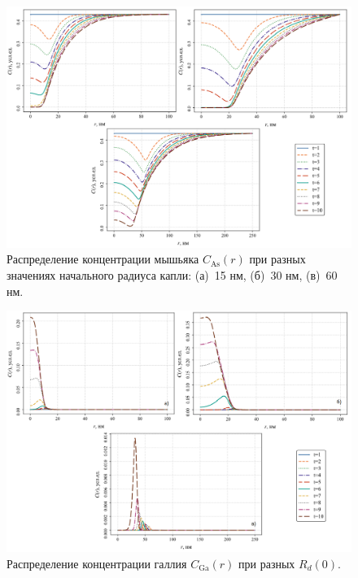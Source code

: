 \documentclass[14pt,oneside]{extarticle}
\begin{document}
\begin{figure}
    \begin{center}
    \includegraphics[width=18cm]{images/C_As_t_3.png}
    \caption{\label{fig:rd_c_as} Распределение концентрации мышьяка $C_{\text{As}}(r)$ при разных значениях начального радиуса капли: (а)~15 нм, (б)~30 нм, (в)~60 нм.}
    \end{center}
\end{figure}

\begin{figure}
    \begin{center}
    \includegraphics[width=18cm]{images/C_Ga_t_3.png}
    \caption{\label{fig:rd_c_ga} Распределение концентрации галлия $C_{\text{Ga}}(r)$ при разных $R_d(0)$.}
    \end{center}
\end{figure}
\end{document}
